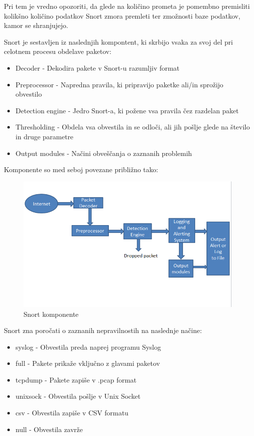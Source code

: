 \documentclass[12pt]{article}
\begin{document}
Pri tem je vredno opozoriti, da glede na količino prometa je pomembno premisliti kolikšno
količino podatkov Snort zmora premleti ter zmožnosti baze podatkov, kamor se shranjujejo.

Snort je sestavljen iz naslednjih kompontent, ki skrbijo vsaka za svoj del pri celotnem procesu obdelave paketov: 

\begin{itemize}
    \item Decoder - Dekodira pakete v Snort-u razumljiv format
    \item Preprocessor - Napredna pravila, ki pripravijo paketke ali/in sprožijo obvestilo
    \item Detection engine - Jedro Snort-a, ki požene vsa pravila čez razdelan paket
    \item Thresholding - Obdela vsa obvestila in se odloči, ali jih pošlje glede na število in druge parametre
    \item Output modules - Načini obveščanja o zaznanih problemih
\end{itemize}

Komponente so med seboj povezane približno tako:

\begin{figure}[htb]
\begin{center}
\includegraphics[scale=0.5]{snort_components.png}
\end{center}
\caption{Snort komponente}
\label{snortcompontents}
\end{figure}


Snort zna poročati o zaznanih nepravilnostih na naslednje načine:

\begin{itemize}
    \item syslog - Obvestila preda naprej programu Syslog
    \item full - Pakete prikaže vključno z glavami paketov
    \item tcpdump - Pakete zapiše v .pcap format
    \item unixsock - Obvestila pošlje v Unix Socket
    \item csv - Obvestila zapiše v CSV formatu
    \item null - Obvestila zavrže
\end{itemize}
\end{document}
